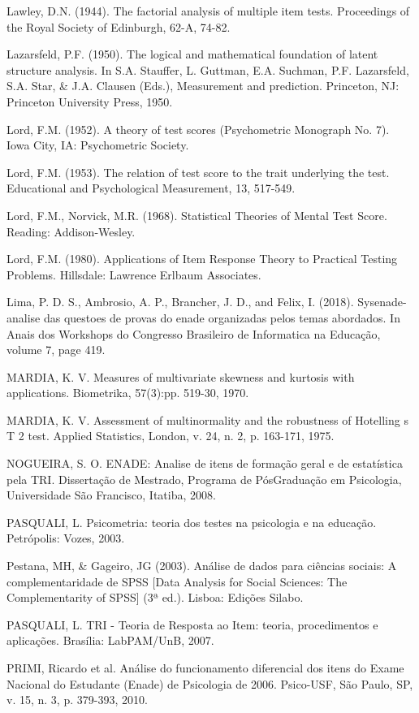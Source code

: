 \documentclass[12pt]{article}
\begin{document}
Lawley, D.N. (1944). The factorial analysis of multiple item tests. Proceedings of the Royal Society of Edinburgh, 62-A, 74-82. 

Lazarsfeld, P.F. (1950). The logical and mathematical foundation of latent structure analysis. In S.A. Stauffer, L. Guttman, E.A. Suchman, P.F. Lazarsfeld, S.A. Star, \& J.A. Clausen (Eds.), Measurement and prediction. Princeton, NJ: Princeton University Press, 1950.

Lord, F.M. (1952). A theory of test scores (Psychometric Monograph No. 7). Iowa City, IA: Psychometric Society.

Lord, F.M. (1953). The relation of test score to the trait underlying the test. Educational and Psychological Measurement, 13, 517-549.

Lord, F.M., Norvick, M.R. (1968). Statistical Theories of Mental Test Score. Reading: Addison-Wesley.

Lord, F.M. (1980). Applications of Item Response Theory to Practical Testing Problems. Hillsdale: Lawrence Erlbaum Associates.

Lima, P. D. S., Ambrosio, A. P., Brancher, J. D., and Felix, I. (2018). Sysenade-analise
das questoes de provas do enade organizadas pelos temas abordados. In Anais dos
Workshops do Congresso Brasileiro de Informatica na Educação, volume 7, page 419.

MARDIA, K. V. Measures of multivariate skewness and kurtosis with applications. Biometrika, 57(3):pp. 519-30, 1970.

MARDIA, K. V. Assessment of multinormality and the robustness of Hotelling s T 2 test. Applied Statistics, London, v. 24, n. 2, p. 163-171, 1975.

NOGUEIRA, S. O. ENADE: Analise de itens de formação geral e de estatística pela TRI. Dissertação de Mestrado, Programa de PósGraduação em Psicologia, Universidade São Francisco, Itatiba, 2008.

PASQUALI, L. Psicometria: teoria dos testes na psicologia e na educação. Petrópolis: Vozes, 2003.

Pestana, MH, \& Gageiro, JG (2003). Análise de dados para ciências sociais: A complementaridade de SPSS [Data Analysis for Social Sciences: The Complementarity of SPSS] (3ª ed.). Lisboa: Edições Silabo.

PASQUALI, L. TRI - Teoria de Resposta ao Item: teoria, procedimentos e aplicações. Brasília: LabPAM/UnB, 2007.

PRIMI, Ricardo et al. Análise do funcionamento diferencial dos itens do Exame Nacional do Estudante (Enade) de Psicologia de 2006. Psico-USF, São Paulo, SP, v. 15, n. 3, p. 379-393, 2010. 
\end{document}
